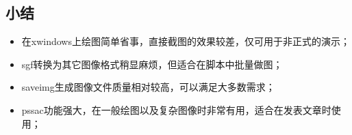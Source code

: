 \subsection{小结}
\begin{itemize}
\item 在xwindows上绘图简单省事，直接截图的效果较差，仅可用于非正式的演示；
\item sgf转换为其它图像格式稍显麻烦，但适合在脚本中批量做图；
\item saveimg生成图像文件质量相对较高，可以满足大多数需求；
\item pssac功能强大，在一般绘图以及复杂图像时非常有用，适合在发表文章时使用；
\end{itemize}
